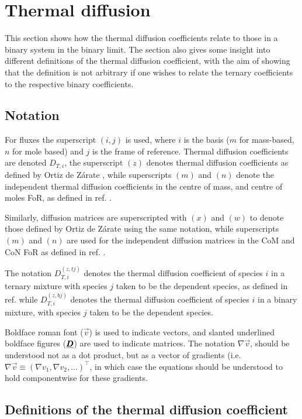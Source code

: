 \section{Thermal diffusion}

This section shows how the thermal diffusion coefficients relate to those in a binary system in the binary limit. The section also gives some insight into different definitions of the thermal diffusion coefficient, with the aim of showing that the definition is not arbitrary if one wishes to relate the ternary coefficients to the respective binary coefficients.

\subsection{Notation}

For fluxes the superscript $(i, j)$ is used, where $i$ is the basis ($m$ for mass-based, $n$ for mole based) and $j$ is the frame of reference. Thermal diffusion coefficients are denoted $D_{T, i}$, the superscript $(z)$ denotes thermal diffusion coefficients as defined by Ortiz de Zárate \cite{ortiz2019definition}, while superscripts $(m)$ and $(n)$ denote the independent thermal diffusion coefficients in the centre of mass, and centre of moles FoR, as defined in ref. \cite{retmie}. 

Similarly, diffusion matrices are superscripted with $(x)$ and $(w)$ to denote those defined by Ortiz de Zárate using the same notation, while superscripts $(m)$ and $(n)$ are used for the independent diffusion matrices in the CoM and CoN FoR as defined in ref. \cite{retmie}.

The notation $D_{T,i}^{(z,tj)}$ denotes the thermal diffusion coefficient of species $i$ in a ternary mixture with species $j$ taken to be the dependent species, as defined in ref. \cite{ortiz2019definition} while $D_{T,i}^{(z,bj)}$ denotes the thermal diffusion coefficient of species $i$ in a binary mixture, with species $j$ taken to be the dependent species.

Boldface roman font ($\Vec{v}$) is used to indicate vectors, and slanted underlined boldface figures ($\underline{\pmb{D}}$) are used to indicate matrices. The notation $\nabla \Vec{v}$, should be understood not as a dot product, but as a vector of gradients (i.e. $\nabla \Vec{v} \equiv (\nabla v_1, \nabla v_2, ...)^\top$, in which case the equations should be understood to hold componentwise for these gradients.

\subsection{Definitions of the thermal diffusion coefficient}

